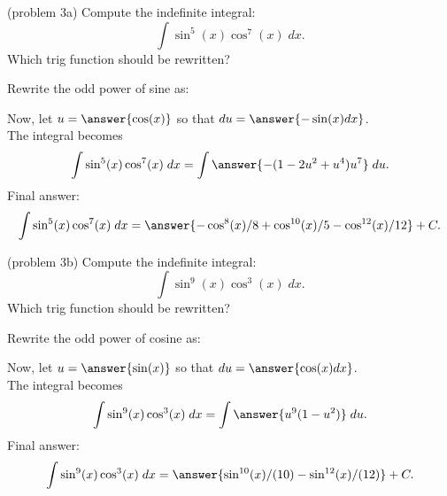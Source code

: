 \documentclass{ximera}
\begin{document}
\begin{problem}(problem 3a)
Compute the indefinite integral:
\[
\int \sin^5(x)\cos^7(x) \; dx.
\]
Which trig function should be rewritten?
\begin{multipleChoice}
\end{multipleChoice}
Rewrite the odd power of sine as:
\begin{multipleChoice}

\end{multipleChoice}

Now, let $u = \answer{\cos(x)}$ so that $du = \answer{-\sin(x) dx}$.\\
The integral becomes
\[
\int \sin^5(x)\cos^7(x) \; dx= \int \answer{-(1-2u^2 + u^4)u^7} \; du.
\]
Final answer:
\[
\int \sin^5(x)\cos^7(x) \; dx= \answer{-\cos^8(x)/8 + \cos^{10}(x)/5 - \cos^{12}(x)/12} + C.
\]
\end{problem}


\begin{problem}(problem 3b)
Compute the indefinite integral:
\[
\int \sin^9(x)\cos^3(x) \; dx.
\]
Which trig function should be rewritten?
\begin{multipleChoice}
\end{multipleChoice}

Rewrite the odd power of cosine as:
\begin{multipleChoice}
\end{multipleChoice}

Now, let $u = \answer{\sin(x)}$ so that $du = \answer{\cos(x) dx}$.\\
The integral becomes
\[
\int \sin^9(x)\cos^3(x) \; dx= \int \answer{u^9(1 - u^2)} \; du.
\]
Final answer:
\[
\int \sin^9(x)\cos^3(x) \; dx= \answer{\sin^{10}(x)/(10) - \sin^{12}(x)/(12) } + C.
\]
\end{problem}


\end{document}
